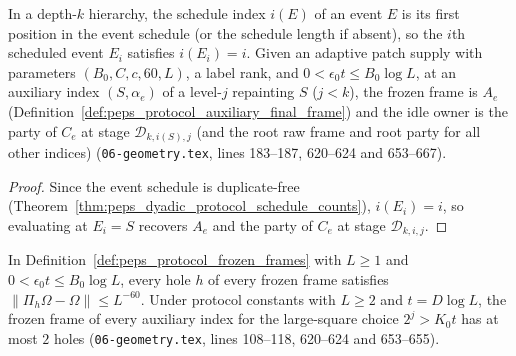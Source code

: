 \begin{definition}
    \label{def:peps_protocol_frozen_frames}
    \leanok
    In a depth-$k$ hierarchy, the schedule index $i(E)$ of an event $E$ is its first position in the event schedule (or the schedule length if absent), so the $i$th scheduled event $E_i$ satisfies $i(E_i)=i$. Given an adaptive patch supply with parameters $(B_0,C,c,60,L)$, a label rank, and $0<\epsilon_0t\le B_0\log L$, at an auxiliary index $(S,\alpha_e)$ of a level-$j$ repainting $S$ ($j<k$), the frozen frame is $A_e$ (Definition~\ref{def:peps_protocol_auxiliary_final_frame}) and the idle owner is the party of $C_e$ at stage $\mathcal D_{k,i(S),j}$ (and the root raw frame and root party for all other indices) (\texttt{06-geometry.tex}, lines 183--187, 620--624 and 653--667).
\end{definition}

\begin{proof}\leanok
    Since the event schedule is duplicate-free (Theorem~\ref{thm:peps_dyadic_protocol_schedule_counts}), $i(E_i)=i$, so evaluating at $E_i=S$ recovers $A_e$ and the party of $C_e$ at stage $\mathcal D_{k,i,j}$.
\end{proof}

\begin{lemma}
    \label{thm:peps_protocol_frozen_frame_bounds}
    \leanok
    In Definition~\ref{def:peps_protocol_frozen_frames} with $L\ge1$ and $0<\epsilon_0t\le B_0\log L$, every hole $h$ of every frozen frame satisfies $\|\Pi_h\Omega-\Omega\|\le L^{-60}$. Under protocol constants with $L\ge2$ and $t=D\log L$, the frozen frame of every auxiliary index for the large-square choice $2^j>K_0t$ has at most $2$ holes (\texttt{06-geometry.tex}, lines 108--118, 620--624 and 653--655).
\end{lemma}

